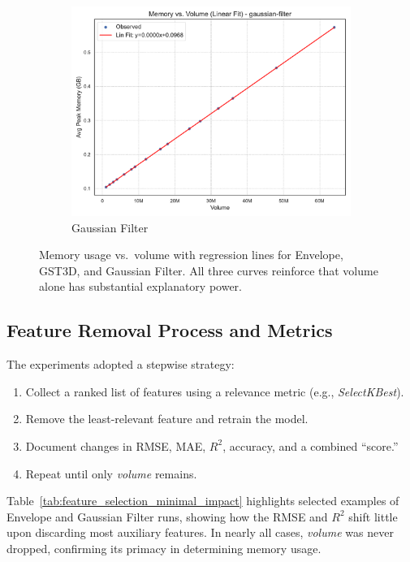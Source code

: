 \begin{figure}[htbp]
\begin{subfigure}[t]{0.32\textwidth}
        \includegraphics[width=\textwidth]{assets/images/05/memory_vs_volume_regression_gaussian-filter}
        \caption{Gaussian Filter}
    \end{subfigure}
    \caption{Memory usage vs.\ volume with regression lines for Envelope, \ac{GST3D}, and Gaussian Filter.
    All three curves reinforce that volume alone has substantial explanatory power.}
    \label{fig:memory_vs_volume_regression_subplots}
\end{figure}

\subsection{Feature Removal Process and Metrics}
\label{subsec:feature-removal-methods-and-metrics}

The experiments adopted a stepwise strategy:
\begin{enumerate}
    \item Collect a ranked list of features using a relevance metric (e.g., \emph{SelectKBest}).
    \item Remove the least-relevant feature and retrain the model.
    \item Document changes in \ac{RMSE}, \ac{MAE}, $R^2$, accuracy, and a combined “score.”
    \item Repeat until only \emph{volume} remains.
\end{enumerate}
Table~\ref{tab:feature_selection_minimal_impact} highlights selected examples of Envelope and Gaussian Filter runs, showing how the \ac{RMSE} and $R^2$ shift little upon discarding most auxiliary features.
In nearly all cases, \emph{volume} was never dropped, confirming its primacy in determining memory usage.

